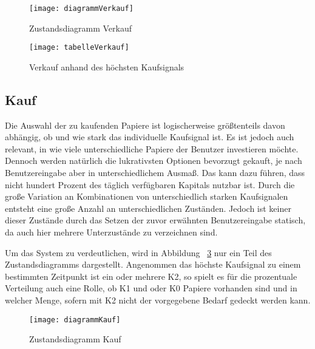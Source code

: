\begin{figure}[!ht]
  \centering
  \texttt{[image: diagrammVerkauf]}
  \caption{Zustandsdiagramm Verkauf}
  \label{diagrammV}
\end{figure}

\begin{figure}[!ht]
  \centering
  \texttt{[image: tabelleVerkauf]}
  \caption{Verkauf anhand des höchsten Kaufsignals}
  \label{tabelleV}
\end{figure}

\subsection{Kauf}
Die Auswahl der zu kaufenden Papiere ist logischerweise größtenteils davon abhängig, ob und wie stark das individuelle Kaufsignal ist. Es ist jedoch auch relevant, in wie viele unterschiedliche Papiere der Benutzer investieren möchte. Dennoch werden natürlich die lukrativsten Optionen bevorzugt gekauft, je nach Benutzereingabe aber in unterschiedlichem Ausmaß. Das kann dazu führen, dass nicht hundert Prozent des täglich verfügbaren Kapitals nutzbar ist. Durch die große Variation an Kombinationen von unterschiedlich starken Kaufsignalen entsteht eine große Anzahl an unterschiedlichen Zuständen. Jedoch ist keiner dieser Zustände durch das Setzen der zuvor erwähnten Benutzereingabe statisch, da auch hier mehrere Unterzustände zu verzeichnen sind.

Um das System zu verdeutlichen, wird in Abbildung ~\ref{diagrammK} nur ein Teil des Zustandsdiagramms dargestellt. Angenommen das höchste Kaufsignal zu einem bestimmten Zeitpunkt ist ein oder mehrere K2, so spielt es für die prozentuale Verteilung auch eine Rolle, ob K1 und oder K0 Papiere vorhanden sind und in welcher Menge, sofern mit K2 nicht der vorgegebene Bedarf gedeckt werden kann.

\begin{figure}[!ht]
  \centering
  \texttt{[image: diagrammKauf]}
  \caption{Zustandsdiagramm Kauf}
  \label{diagrammK}
\end{figure}





